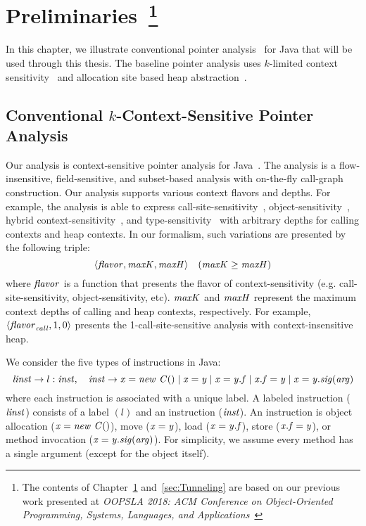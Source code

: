 \chapter{Preliminaries~\footnote{The contents of Chapter~\ref{sec:Preliminaries} and~\ref{sec:Tunneling} are based on our previous work presented at \emph{OOPSLA 2018: ACM Conference on Object-Oriented Programming, Systems, Languages, and Applications}~\cite{JeJeOh18}}}\label{sec:Preliminaries}
In this chapter, we illustrate conventional pointer analysis~\cite{Smaragdakis2015,KastrinisS13a} for Java that will be used through this thesis. 
The baseline pointer analysis uses $k$-limited context sensitivity~\cite{KastrinisS13a,Smaragdakis2011} and allocation site based heap abstraction~\cite{Smaragdakis2015,Tan2017}.



\section{Conventional $k$-Context-Sensitive Pointer Analysis}\label{pre:conventional-analysis}
Our analysis is 
context-sensitive pointer analysis for Java~\cite{Smaragdakis2015}.
The analysis is a flow-insensitive, field-sensitive, and subset-based
analysis with on-the-fly call-graph construction. 
Our analysis supports various context flavors and depths.
For example, the analysis is able to express
call-site-sensitivity~\cite{Shivers1988},
object-sensitivity~\cite{Milanova2005}, hybrid
context-sensitivity~\cite{KastrinisS13a}, and
type-sensitivity~\cite{Smaragdakis2011} with arbitrary depths for
calling contexts and heap contexts. In our formalism, such variations
are presented by the following triple:
\[
  \langle {\it flavor}, {\it maxK}, {\it maxH} \rangle \quad ({\it maxK} \ge {\it maxH})
\]
where ${\it flavor}$ is a function that presents the flavor of
context-sensitivity (e.g. call-site-sensitivity, object-sensitivity,
etc). ${\it maxK}$ and ${\it maxH}$ represent the maximum context depths
of calling and heap contexts, respectively. For example,
$\langle {\it flavor}_{\it call}, 1, 0 \rangle$ presents the 1-call-site-sensitive
analysis with context-insensitive heap. 


We consider the five types of instructions in Java:
\[
  {\it linst} \to l: {\it inst}, \quad {\it inst} \to {\it x = new~C()} \mid {\it x = y}
  \mid {\it x = y.f} \mid {\it x.f = y} \mid {\it x = y.sig(arg)}
\]
where each instruction is associated with a unique label.  A labeled
instruction (${\it linst}$) consists of a label $(l)$ and an instruction
(${\it inst}$). An instruction is object allocation (${\it x = new~C()}$),
move (${\it x = y}$), load (${\it x=y.{\it f}}$), store
(${\it x.{\it f} = y}$), or method invocation (${\it
  x=y.{\it sig}(arg)}$). For simplicity, we assume every method has a
single argument (except for the object itself).

